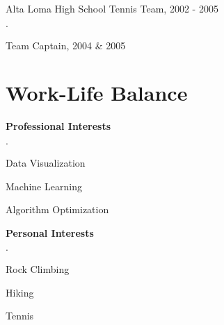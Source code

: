 \documentclass[margin,line]{res}
\newenvironment{list2}{
  \begin{list}{$\cdot$}{%
      \setlength{\itemsep}{0in}
      \setlength{\parsep}{0in} \setlength{\parskip}{0in}
      \setlength{\topsep}{0in} \setlength{\partopsep}{0in} 
      \setlength{\leftmargin}{0.2in}}}{\end{list}}
\begin{document}
\begin{resume}
\vspace*{-2.5mm}
Alta Loma High School Tennis Team, 2002 - 2005
\begin{list2}
\item Team Captain, 2004 \& 2005
\end{list2}


\section{\sc Work-Life Balance}

{\bf Professional Interests}
\begin{list2}
\item Data Visualization
\item Machine Learning
\item Algorithm Optimization
\end{list2}

\vspace*{-2.5mm}

{\bf Personal Interests}
\begin{list2}
\item Rock Climbing
\item Hiking
\item Tennis
\end{list2}


\end{resume}
\end{document}
